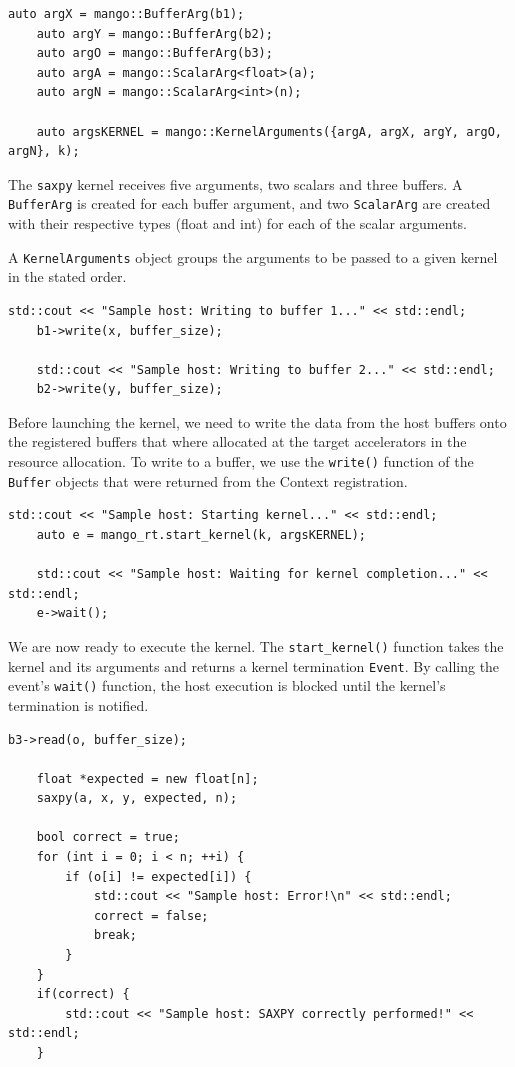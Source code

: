 \begin{lstlisting}[style=CStyle, caption=Sample - Arguments set up]
    auto argX = mango::BufferArg(b1);
    auto argY = mango::BufferArg(b2);
    auto argO = mango::BufferArg(b3);
    auto argA = mango::ScalarArg<float>(a);
    auto argN = mango::ScalarArg<int>(n);

    auto argsKERNEL = mango::KernelArguments({argA, argX, argY, argO, argN}, k);
\end{lstlisting}

The \texttt{saxpy} kernel receives five arguments, two scalars and three buffers. A \texttt{BufferArg} is created for each buffer argument, and two \texttt{ScalarArg} are created with their respective types (float and int) for each of the scalar arguments.

A \texttt{KernelArguments} object groups the arguments to be passed to a given kernel in the stated order.

\begin{lstlisting}[style=CStyle, caption=Sample - Writing buffers]
    std::cout << "Sample host: Writing to buffer 1..." << std::endl;
    b1->write(x, buffer_size);

    std::cout << "Sample host: Writing to buffer 2..." << std::endl;
    b2->write(y, buffer_size);
\end{lstlisting}

Before launching the kernel, we need to write the data from the host buffers onto the registered buffers that where allocated at the target accelerators in the resource allocation. To write to a buffer, we use the \texttt{write()} function of the \texttt{Buffer} objects that were returned from the Context registration.
    
\begin{lstlisting}[style=CStyle, caption=Sample - Kernel launch]
    std::cout << "Sample host: Starting kernel..." << std::endl;
    auto e = mango_rt.start_kernel(k, argsKERNEL);

    std::cout << "Sample host: Waiting for kernel completion..." << std::endl;
    e->wait();
\end{lstlisting}

We are now ready to execute the kernel. The \texttt{start\_kernel()} function takes the kernel and its arguments and returns a kernel termination \texttt{Event}. By calling the event's \texttt{wait()} function, the host execution is blocked until the kernel's termination is notified.

\begin{lstlisting}[style=CStyle, caption=Sample - Checking results]
    b3->read(o, buffer_size);

    float *expected = new float[n];
    saxpy(a, x, y, expected, n);

    bool correct = true;
    for (int i = 0; i < n; ++i) {
        if (o[i] != expected[i]) {
            std::cout << "Sample host: Error!\n" << std::endl;
            correct = false;
            break;
        }
    }
    if(correct) {
        std::cout << "Sample host: SAXPY correctly performed!" << std::endl;
    }
\end{lstlisting}

